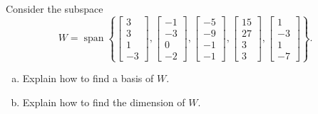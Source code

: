 
\begin{exerciseStatement}


Consider the subspace \[W=\operatorname{span}  \left\{ \left[\begin{array}{c}
3 \\
3 \\
1 \\
-3
\end{array}\right] , \left[\begin{array}{c}
-1 \\
-3 \\
0 \\
-2
\end{array}\right] , \left[\begin{array}{c}
-5 \\
-9 \\
-1 \\
-1
\end{array}\right] , \left[\begin{array}{c}
15 \\
27 \\
3 \\
3
\end{array}\right] , \left[\begin{array}{c}
1 \\
-3 \\
1 \\
-7
\end{array}\right] \right\} .\]


\begin{enumerate}[(a)]
\item  Explain how to find a basis of \(W\).
\item  Explain how to find the dimension of \(W\).
\end{enumerate}
    
\end{exerciseStatement}
    
